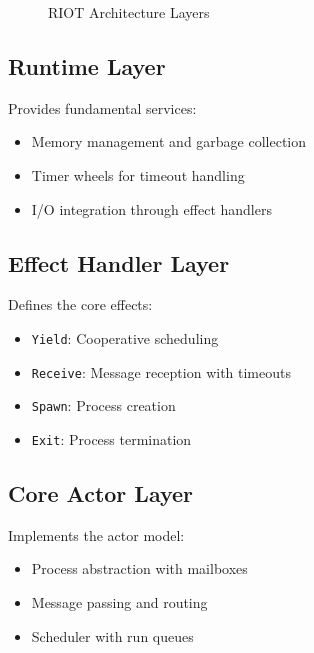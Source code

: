 \documentclass[12pt,a4paper]{report}
\begin{document}
\begin{figure}[h]
\centering
{}
\caption{RIOT Architecture Layers}
\end{figure}

\subsection{Runtime Layer}
Provides fundamental services:
\begin{itemize}
\item Memory management and garbage collection
\item Timer wheels for timeout handling
\item I/O integration through effect handlers
\end{itemize}

\subsection{Effect Handler Layer}
Defines the core effects:
\begin{itemize}
\item \texttt{Yield}: Cooperative scheduling
\item \texttt{Receive}: Message reception with timeouts
\item \texttt{Spawn}: Process creation
\item \texttt{Exit}: Process termination
\end{itemize}

\subsection{Core Actor Layer}
Implements the actor model:
\begin{itemize}
\item Process abstraction with mailboxes
\item Message passing and routing
\item Scheduler with run queues
\end{itemize}
\end{document}

